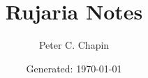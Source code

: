 \documentclass{book}
\begin{document}
\title{Rujaria Notes}
\author{Peter C. Chapin}
\date{Generated: \today}
\maketitle



\end{document}
